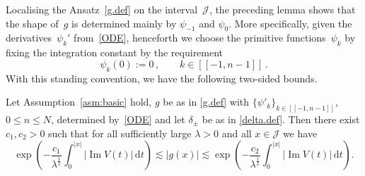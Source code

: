 Localising the Ansatz~\eqref{g.def} on the interval~$\mathcal{J}$,
the preceding lemma shows that the shape of~$g$ 
is determined mainly by $\psi_{-1}$ and $\psi_0$.
More specifically, given the derivatives~$\psi_k'$ from~\eqref{ODE},
henceforth we choose the primitive functions~$\psi_k$ by fixing the integration
constant by the requirement
\begin{equation}\label{constant.fixing}
  \psi_k(0) := 0 
  \,, \qquad
  k \in [[-1,n-1]]
  \,.
\end{equation}
With this standing convention, 
we have the following two-sided bounds.
\begin{Lemma}\label{lem:g.est}
Let Assumption~\ref{asm:basic} hold, 
$g$ be as in \eqref{g.def} with $\{\psi'_k\}_{k\in[[-1,n-1]]}$, 
$0 \leq n \leq N$, determined by~\eqref{ODE} and let $\delta_\pm$ 
be as in \eqref{delta.def}. 
Then there exist $c_1, c_2 >0$ such that 
for all sufficiently large $\lambda >0$ and all $x \in {\mathcal J}$ we have
\begin{equation}\label{|g|.est}
\exp\left(-\frac{c_1}{\lambda^\frac12}  \int_0^{|x|} |{\operatorname{Im}} V(t)| \, {\mathrm{d}} t \right)  
{\lesssim} |g(x)| {\lesssim}  
\exp\left(-\frac{c_2}{\lambda^\frac12}  \int_0^{|x|} |{\operatorname{Im}} V(t)| \, {\mathrm{d}} t \right).
\end{equation}
\end{Lemma}
